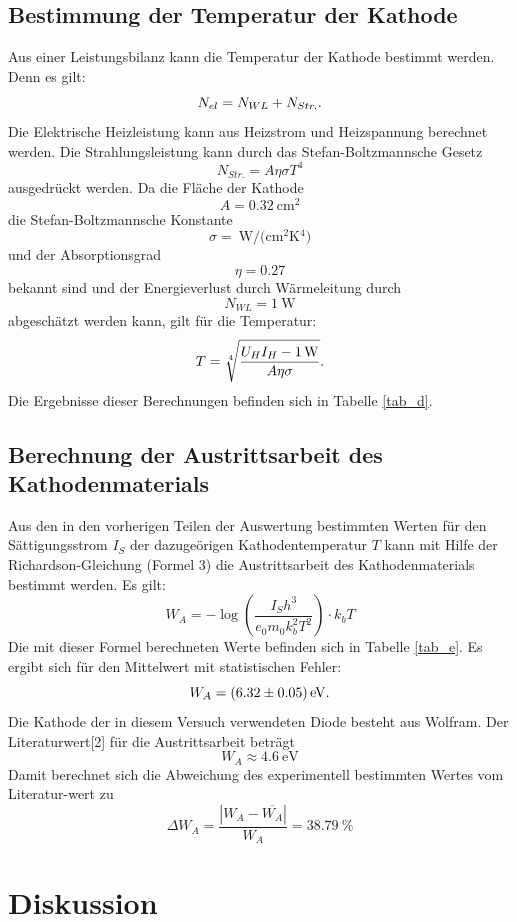 \documentclass[11pt,ngerman,a4paper]{article}
\begin{document}
\subsection{Bestimmung der Temperatur der Kathode}

Aus einer Leistungsbilanz kann die Temperatur der Kathode bestimmt werden. Denn es gilt:
\[
N_{el} = N_{WL} + N_{Str.}\rm.
\]
Die Elektrische Heizleistung kann aus Heizstrom und Heizspannung berechnet werden. Die Strahlungsleistung kann durch das Stefan-Boltzmannsche Gesetz
\[
N_{Str.} = A \eta\sigma T^4
\]
ausgedrückt werden. Da die Fläche der Kathode 
\[
A = \SI{0,32}{\centi\meter\squared}
\]
die Stefan-Boltzmannsche Konstante 
\[
\sigma = \SI{}{\watt\per(\centi\meter\squared\kelvin^4)}
\]
und der Absorptionsgrad
\[
\eta = \num{0,27}
\]
bekannt sind und der Energieverlust durch Wärmeleitung durch
\[
N_{WL} = \SI{1}{\watt}
\]
abgeschätzt werden kann, gilt für die Temperatur:
\[
T = \sqrt[4]{\frac{U_H I_H - \SI{1}{\watt}}{A\eta\sigma}}\rm.
\]
Die Ergebnisse dieser Berechnungen befinden sich in Tabelle \ref{tab_d}.

\subsection{Berechnung der Austrittsarbeit des Kathodenmaterials}
Aus den in den vorherigen Teilen der Auswertung bestimmten Werten für den Sättigungsstrom $I_S$ der dazugeörigen Kathodentemperatur $T$ kann mit Hilfe der Richardson-Gleichung (Formel 3) die Austrittsarbeit des Kathodenmaterials bestimmt werden. Es gilt:
\[
W_A = -\log\left( \frac{I_S h^3}{e_0 m_0 k_b^2 T^2}\right)\cdot k_b T
\]
Die mit dieser Formel berechneten Werte befinden sich in Tabelle \ref{tab_e}. Es ergibt sich für den Mittelwert mit statistischen Fehler:
\[
 W_A = \SI{6.32+-0.05}{\eV}\rm.
\]
Die Kathode der in diesem Versuch verwendeten Diode besteht aus Wolfram. Der Literaturwert[2] für die Austrittsarbeit beträgt
\[
W_A \approx \SI{4,6}{\eV}
\]
Damit berechnet sich die Abweichung des experimentell bestimmten Wertes vom Literatur-wert zu
\[
\Delta W_A = \frac{|W_A-\overline{W_A}|}{W_A} = \SI{38,79}{\percent} 
\]

\section{Diskussion}
\end{document}
